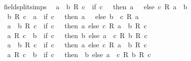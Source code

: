 \begin{isabellebody}
\ {\isacharbrackleft}{\kern0pt}field{\isacharunderscore}{\kern0pt}split{\isacharunderscore}{\kern0pt}simps{\isacharbrackright}{\kern0pt}{\isacharcolon}{\kern0pt}\isanewline
\ \ {\isachardoublequoteopen}a\ {\isacharequal}{\kern0pt}\ b\ {\isacharslash}{\kern0pt}\isactrlsub R\ c\ {\isasymlongleftrightarrow}\ {\isacharparenleft}{\kern0pt}if\ c\ {\isacharequal}{\kern0pt}\ {}\ then\ a\ {\isacharequal}{\kern0pt}\ {}\ else\ c\ {\isacharasterisk}{\kern0pt}\isactrlsub R\ a\ {\isacharequal}{\kern0pt}\ b{\isacharparenright}{\kern0pt}{\isachardoublequoteclose}\isanewline
\ \ {\isachardoublequoteopen}b\ {\isacharslash}{\kern0pt}\isactrlsub R\ c\ {\isacharequal}{\kern0pt}\ a\ {\isasymlongleftrightarrow}\ {\isacharparenleft}{\kern0pt}if\ c\ {\isacharequal}{\kern0pt}\ {}\ then\ a\ {\isacharequal}{\kern0pt}\ {}\ else\ b\ {\isacharequal}{\kern0pt}\ c\ {\isacharasterisk}{\kern0pt}\isactrlsub R\ a{\isacharparenright}{\kern0pt}{\isachardoublequoteclose}\isanewline
\ \ {\isachardoublequoteopen}a\ {\isacharplus}{\kern0pt}\ b\ {\isacharslash}{\kern0pt}\isactrlsub R\ c\ {\isacharequal}{\kern0pt}\ {\isacharparenleft}{\kern0pt}if\ c\ {\isacharequal}{\kern0pt}\ {}\ then\ a\ else\ {\isacharparenleft}{\kern0pt}c\ {\isacharasterisk}{\kern0pt}\isactrlsub R\ a\ {\isacharplus}{\kern0pt}\ b{\isacharparenright}{\kern0pt}\ {\isacharslash}{\kern0pt}\isactrlsub R\ c{\isacharparenright}{\kern0pt}{\isachardoublequoteclose}\isanewline
\ \ {\isachardoublequoteopen}a\ {\isacharslash}{\kern0pt}\isactrlsub R\ c\ {\isacharplus}{\kern0pt}\ b\ {\isacharequal}{\kern0pt}\ {\isacharparenleft}{\kern0pt}if\ c\ {\isacharequal}{\kern0pt}\ {}\ then\ b\ else\ {\isacharparenleft}{\kern0pt}a\ {\isacharplus}{\kern0pt}\ c\ {\isacharasterisk}{\kern0pt}\isactrlsub R\ b{\isacharparenright}{\kern0pt}\ {\isacharslash}{\kern0pt}\isactrlsub R\ c{\isacharparenright}{\kern0pt}{\isachardoublequoteclose}\isanewline
\ \ {\isachardoublequoteopen}a\ {\isacharminus}{\kern0pt}\ b\ {\isacharslash}{\kern0pt}\isactrlsub R\ c\ {\isacharequal}{\kern0pt}\ {\isacharparenleft}{\kern0pt}if\ c\ {\isacharequal}{\kern0pt}\ {}\ then\ a\ else\ {\isacharparenleft}{\kern0pt}c\ {\isacharasterisk}{\kern0pt}\isactrlsub R\ a\ {\isacharminus}{\kern0pt}\ b{\isacharparenright}{\kern0pt}\ {\isacharslash}{\kern0pt}\isactrlsub R\ c{\isacharparenright}{\kern0pt}{\isachardoublequoteclose}\isanewline
\ \ {\isachardoublequoteopen}a\ {\isacharslash}{\kern0pt}\isactrlsub R\ c\ {\isacharminus}{\kern0pt}\ b\ {\isacharequal}{\kern0pt}\ {\isacharparenleft}{\kern0pt}if\ c\ {\isacharequal}{\kern0pt}\ {}\ then\ {\isacharminus}{\kern0pt}\ b\ else\ {\isacharparenleft}{\kern0pt}a\ {\isacharminus}{\kern0pt}\ c\ {\isacharasterisk}{\kern0pt}\isactrlsub R\ b{\isacharparenright}{\kern0pt}\ {\isacharslash}{\kern0pt}\isactrlsub R\ c{\isacharparenright}{\kern0pt}{\isachardoublequoteclose}\isanewline

\end{isabellebody}
